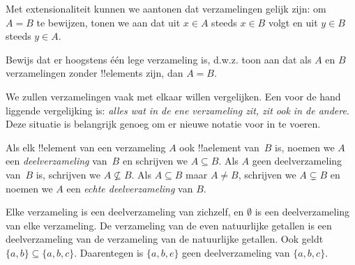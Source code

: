 \documentclass[openany]{memoir}
\begin{document}
Met extensionaliteit kunnen we aantonen dat verzamelingen gelijk zijn: om
$A = B$ te bewijzen, tonen we aan dat uit $x \in A$ steeds $x \in B$ volgt
en uit $y \in B$ steeds $y \in A$.

\begin{prob}
Bewijs dat er hoogstens één lege verzameling is, d.w.z. toon aan dat
als $A$ en $B$ verzamelingen zonder !!{element}s zijn, dan $A = B$.
\end{prob}
\endgroup

\begingroup
\def\olfilename{OLP-0006}
\def\olfilepath{content/sets-functions-relations/sets/}
\hypertarget{unit-OLP-0006}{}




\begin{explain}
We zullen verzamelingen vaak met elkaar willen vergelijken. Een voor de
hand liggende vergelijking is: \emph{alles wat in de ene verzameling
zit, zit ook in de andere}. Deze situatie is belangrijk genoeg om er
nieuwe notatie voor in te voeren.
\end{explain}

\begin{defn}[Deelverzameling]
Als elk !!{element} van een verzameling $A$ ook !!a{element} van~$B$
is, noemen we $A$ een \emph{deelverzameling} van~$B$ en schrijven we
$A \subseteq B$. Als $A$ geen deelverzameling van~$B$ is, schrijven
we $A \not\subseteq B$. Als $A \subseteq B$ maar $A \neq B$, schrijven
we $A \subsetneq B$ en noemen we $A$ een \emph{echte
deelverzameling} van $B$.
\end{defn}

\begin{ex}
Elke verzameling is een deelverzameling van zichzelf, en $\emptyset$
is een deelverzameling van elke verzameling. De verzameling van de even
natuurlijke getallen is een deelverzameling van de verzameling van de
natuurlijke getallen. Ook geldt $\{ a, b \} \subseteq \{ a, b, c \}$.
Daarentegen is $\{ a, b, e \}$ geen deelverzameling van
$\{ a, b, c \}$.
\end{ex}
\end{document}
